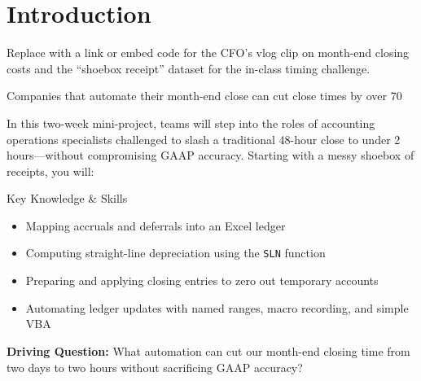 \section{Introduction}

\begin{Replace}
Replace with a link or embed code for the CFO’s vlog clip on month-end closing costs and the “shoebox receipt” dataset for the in-class timing challenge.
\end{Replace}

\begin{Trivia}
Companies that automate their month-end close can cut close times by over 70 %
\end{Trivia}

In this two-week mini-project, teams will step into the roles of accounting operations specialists challenged to slash a traditional 48-hour close to under 2 hours—without compromising GAAP accuracy. Starting with a messy shoebox of receipts, you will:

\begin{skillbox}{Key Knowledge \& Skills}
\begin{itemize}
  \item Mapping accruals and deferrals into an Excel ledger  
  \item Computing straight-line depreciation using the \texttt{SLN} function  
  \item Preparing and applying closing entries to zero out temporary accounts  
  \item Automating ledger updates with named ranges, macro recording, and simple VBA  
\end{itemize}
\end{skillbox}

\begin{Important}
\textbf{Driving Question:} What automation can cut our month-end closing time from two days to two hours without sacrificing GAAP accuracy?
\end{Important}


\clearpage
